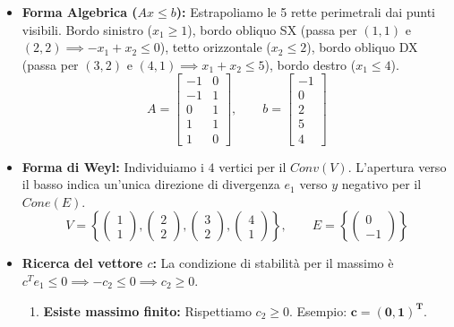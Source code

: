 \documentclass[12pt, a4paper]{article}
\begin{document}
	\begin{itemize}[label=\textcolor{titlecolor}{\Large\textbullet}, itemsep=4pt, leftmargin=1.5cm]
		\item \textbf{Forma Algebrica ($Ax \leq b$):} Estrapoliamo le 5 rette perimetrali dai punti visibili. Bordo sinistro ($x_1 \geq 1$), bordo obliquo SX (passa per $(1,1)$ e $(2,2) \implies -x_1 + x_2 \leq 0$), tetto orizzontale ($x_2 \leq 2$), bordo obliquo DX (passa per $(3,2)$ e $(4,1) \implies x_1 + x_2 \leq 5$), bordo destro ($x_1 \leq 4$).
		\[
		A = \begin{bmatrix} -1 & 0 \\ -1 & 1 \\ 0 & 1 \\ 1 & 1 \\ 1 & 0 \end{bmatrix}, \qquad b = \begin{bmatrix} -1 \\ 0 \\ 2 \\ 5 \\ 4 \end{bmatrix}
		\]
		\item \textbf{Forma di Weyl:} Individuiamo i $4$ vertici per il $Conv(V)$. L'apertura verso il basso indica un'unica direzione di divergenza $e_1$ verso $y$ negativo per il $Cone(E)$.
		\[
		V = \left\{ \begin{pmatrix} 1 \\ 1 \end{pmatrix}, \begin{pmatrix} 2 \\ 2 \end{pmatrix}, \begin{pmatrix} 3 \\ 2 \end{pmatrix}, \begin{pmatrix} 4 \\ 1 \end{pmatrix} \right\}, \qquad E = \left\{ \begin{pmatrix} 0 \\ -1 \end{pmatrix} \right\}
		\]
		\item \textbf{Ricerca del vettore $c$:} La condizione di stabilità per il massimo è $c^T e_1 \leq 0 \implies -c_2 \leq 0 \implies c_2 \geq 0$.
		\begin{enumerate}[label=\alph*)]
			\item \textbf{Esiste massimo finito:} Rispettiamo $c_2 \geq 0$. Esempio: $\mathbf{c = (0, 1)^T}$.

\end{enumerate}
\end{itemize}
\end{document}
